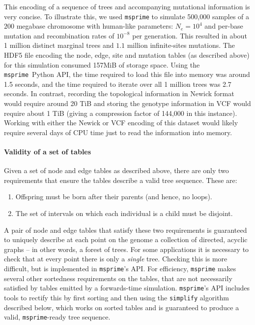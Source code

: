 \documentclass{article}
\newcommand{\msprime}{\texttt{msprime}}
\begin{document}
This encoding of a sequence of trees and accompanying mutational information is
very concise. To illustrate this, we used \msprime{} to simulate 500,000 samples of a
$200$ megabase chromosome with human-like parameters: $N_e=10^4$ and per-base mutation and
recombination rates of $10^{-8}$ per generation. This resulted
in about 1 million distinct marginal trees and $1.1$ million infinite-sites
mutations. The HDF5 file encoding the node, edge, site and mutation tables (as
described above) for this simulation consumed 157MiB of storage space. Using
the \msprime\ Python API, the time required to load this file into memory was
around 1.5 seconds, and the time required to iterate over all 1 million trees
was 2.7 seconds. In contrast, recording the topological information in Newick
format would require around 20 TiB and storing the genotype information
in VCF would require about 1 TiB (giving a compression factor of 144,000 in
this instance).
Working with either the Newick or VCF encoding
of this dataset would likely require several
days of CPU time just to read the information into memory.

\paragraph{Validity of a set of tables}
Given a set of node and edge tables as described above,
there are only two requirements that ensure the tables
describe a valid tree sequence.
These are:
\begin{enumerate}
    \item Offspring must be born after their parents (and hence, no loops).
    \item The set of intervals on which each individual is a child must be disjoint.
\end{enumerate}
A pair of node and edge tables that satisfy these two requirements
is guaranteed to uniquely describe at each point on the genome
a collection of directed, acyclic graphs -- in other words, a forest of trees.
For some applications it is necessary to check that at every point
there is only a \emph{single} tree.
Checking this is more difficult, but is implemented in \msprime{}'s API.
For efficiency, \msprime{} makes several other sortedness requirements on the tables,
that are not necessarily satisfied by tables emitted by a forwards-time simulation.
\msprime{}'s API includes tools to rectify this by first sorting %
and then using the \texttt{simplify} algorithm described below, which works on sorted tables
and is guaranteed to produce a valid, \msprime{}-ready tree sequence.
\end{document}
